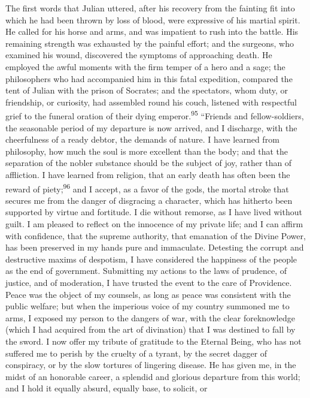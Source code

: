 The first words that Julian uttered, after his recovery from the
fainting fit into which he had been thrown by loss of blood, were
expressive of his martial spirit. He called for his horse and
arms, and was impatient to rush into the battle. His remaining
strength was exhausted by the painful effort; and the surgeons,
who examined his wound, discovered the symptoms of approaching
death. He employed the awful moments with the firm temper of a
hero and a sage; the philosophers who had accompanied him in this
fatal expedition, compared the tent of Julian with the prison of
Socrates; and the spectators, whom duty, or friendship, or
curiosity, had assembled round his couch, listened with
respectful grief to the funeral oration of their dying emperor.\textsuperscript{95}
“Friends and fellow-soldiers, the seasonable period of my
departure is now arrived, and I discharge, with the cheerfulness
of a ready debtor, the demands of nature. I have learned from
philosophy, how much the soul is more excellent than the body;
and that the separation of the nobler substance should be the
subject of joy, rather than of affliction. I have learned from
religion, that an early death has often been the reward of piety;\textsuperscript{96}
and I accept, as a favor of the gods, the mortal stroke that
secures me from the danger of disgracing a character, which has
hitherto been supported by virtue and fortitude. I die without
remorse, as I have lived without guilt. I am pleased to reflect
on the innocence of my private life; and I can affirm with
confidence, that the supreme authority, that emanation of the
Divine Power, has been preserved in my hands pure and immaculate.
Detesting the corrupt and destructive maxims of despotism, I have
considered the happiness of the people as the end of government.
Submitting my actions to the laws of prudence, of justice, and of
moderation, I have trusted the event to the care of Providence.
Peace was the object of my counsels, as long as peace was
consistent with the public welfare; but when the imperious voice
of my country summoned me to arms, I exposed my person to the
dangers of war, with the clear foreknowledge (which I had
acquired from the art of divination) that I was destined to fall
by the sword. I now offer my tribute of gratitude to the Eternal
Being, who has not suffered me to perish by the cruelty of a
tyrant, by the secret dagger of conspiracy, or by the slow
tortures of lingering disease. He has given me, in the midst of
an honorable career, a splendid and glorious departure from this
world; and I hold it equally absurd, equally base, to solicit, or
